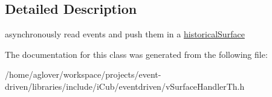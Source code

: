 \subsection{Detailed Description}
asynchronously read events and push them in a \hyperlink{classev_1_1historicalSurface}{historical\+Surface} 

The documentation for this class was generated from the following file\+:\begin{DoxyCompactItemize}
\item 
/home/aglover/workspace/projects/event-\/driven/libraries/include/i\+Cub/eventdriven/v\+Surface\+Handler\+Th.\+h\end{DoxyCompactItemize}

